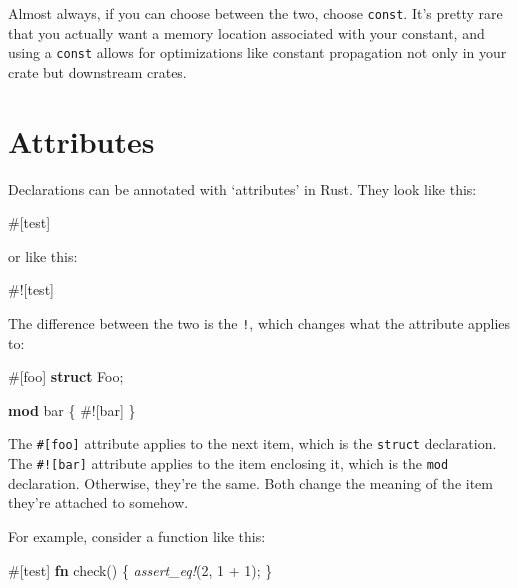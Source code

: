 \documentclass[a4paper,]{book}
\newenvironment{Shaded}{\begin{snugshade}}{\end{snugshade}}
\newcommand{\KeywordTok}[1]{\textcolor[rgb]{0.13,0.29,0.53}{\textbf{{#1}}}}
\newcommand{\DecValTok}[1]{\textcolor[rgb]{0.00,0.00,0.81}{{#1}}}
\newcommand{\PreprocessorTok}[1]{\textcolor[rgb]{0.56,0.35,0.01}{\textit{{#1}}}}
\newcommand{\AttributeTok}[1]{\textcolor[rgb]{0.77,0.63,0.00}{{#1}}}
\newcommand{\NormalTok}[1]{{#1}}
\begin{document}
Almost always, if you can choose between the two, choose \texttt{const}.
It's pretty rare that you actually want a memory location associated
with your constant, and using a \texttt{const} allows for optimizations
like constant propagation not only in your crate but downstream crates.

\hypertarget{sec--attributes}{\section{Attributes}\label{sec--attributes}}

Declarations can be annotated with `attributes' in Rust. They look like
this:

\begin{Shaded}
\begin{Highlighting}[]
\AttributeTok{#[}\NormalTok{test}\AttributeTok{]}
\end{Highlighting}
\end{Shaded}

or like this:

\begin{Shaded}
\begin{Highlighting}[]
\AttributeTok{#![}\NormalTok{test}\AttributeTok{]}
\end{Highlighting}
\end{Shaded}

The difference between the two is the \texttt{!}, which changes what the
attribute applies to:

\begin{Shaded}
\begin{Highlighting}[]
\AttributeTok{#[}\NormalTok{foo}\AttributeTok{]}
\KeywordTok{struct} \NormalTok{Foo;}

\KeywordTok{mod} \NormalTok{bar \{}
    \AttributeTok{#![}\NormalTok{bar}\AttributeTok{]}
\NormalTok{\}}
\end{Highlighting}
\end{Shaded}

The \texttt{\#{[}foo{]}} attribute applies to the next item, which is
the \texttt{struct} declaration. The \texttt{\#!{[}bar{]}} attribute
applies to the item enclosing it, which is the \texttt{mod} declaration.
Otherwise, they're the same. Both change the meaning of the item they're
attached to somehow.

For example, consider a function like this:

\begin{Shaded}
\begin{Highlighting}[]
\AttributeTok{#[}\NormalTok{test}\AttributeTok{]}
\KeywordTok{fn} \NormalTok{check() \{}
    \PreprocessorTok{assert_eq!}\NormalTok{(}\DecValTok{2}\NormalTok{, }\DecValTok{1} \NormalTok{+ }\DecValTok{1}\NormalTok{);}
\NormalTok{\}}
\end{Highlighting}
\end{Shaded}
\end{document}
